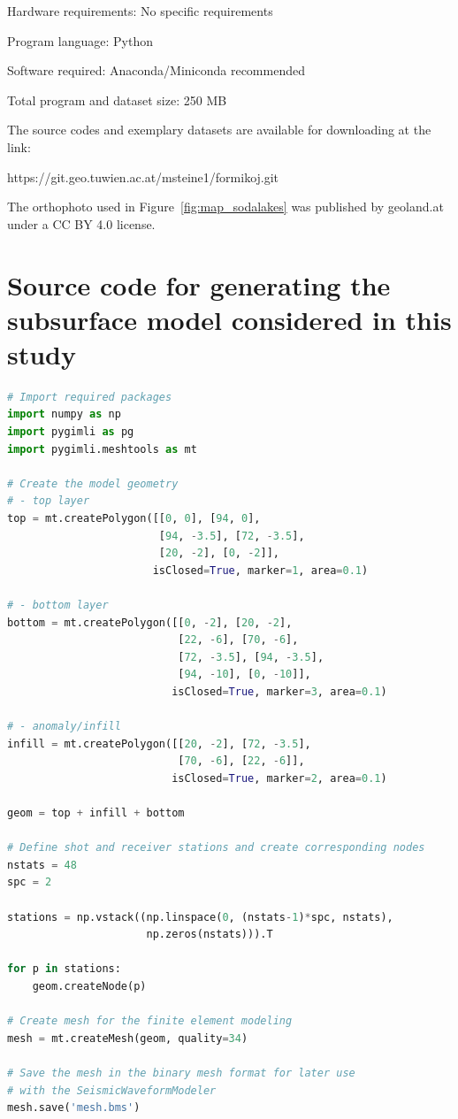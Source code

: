 \documentclass[a4paper,fleqn]{cas-sc}
\begin{document}
Hardware requirements: No specific requirements

Program language: Python
 
Software required: Anaconda/Miniconda recommended

Total program and dataset size: 250 MB

The source codes and exemplary datasets are available for downloading at the link:

https://git.geo.tuwien.ac.at/msteine1/formikoj.git

The orthophoto used in Figure~\ref{fig:map_sodalakes} was published by geoland.at under a CC BY 4.0 license.

\appendix

\section{Source code for generating the subsurface model considered in this study}
\begin{lstlisting}[language=Python]
# Import required packages
import numpy as np
import pygimli as pg
import pygimli.meshtools as mt

# Create the model geometry
# - top layer
top = mt.createPolygon([[0, 0], [94, 0], 
                        [94, -3.5], [72, -3.5], 
                        [20, -2], [0, -2]],
                       isClosed=True, marker=1, area=0.1)

# - bottom layer
bottom = mt.createPolygon([[0, -2], [20, -2], 
                           [22, -6], [70, -6], 
                           [72, -3.5], [94, -3.5], 
                           [94, -10], [0, -10]],
                          isClosed=True, marker=3, area=0.1)

# - anomaly/infill
infill = mt.createPolygon([[20, -2], [72, -3.5], 
                           [70, -6], [22, -6]],
                          isClosed=True, marker=2, area=0.1)

geom = top + infill + bottom

# Define shot and receiver stations and create corresponding nodes
nstats = 48
spc = 2

stations = np.vstack((np.linspace(0, (nstats-1)*spc, nstats), 
                      np.zeros(nstats))).T

for p in stations:
    geom.createNode(p)

# Create mesh for the finite element modeling
mesh = mt.createMesh(geom, quality=34)

# Save the mesh in the binary mesh format for later use 
# with the SeismicWaveformModeler
mesh.save('mesh.bms')
\end{lstlisting}


 
\end{document}
